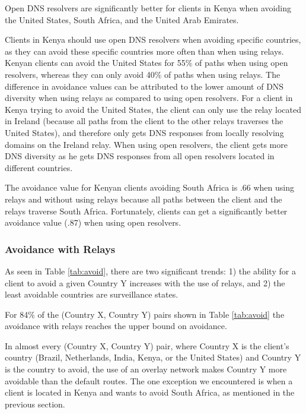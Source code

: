 \begin{finding}
Open DNS resolvers are significantly better for clients in Kenya when avoiding the United States, South Africa, and the United Arab Emirates.
\end{finding}
Clients in Kenya should use open DNS resolvers when avoiding specific countries, as they can avoid these specific countries more often than when using relays.  Kenyan clients can avoid the United States for 55\% of paths when using open resolvers, whereas they can only avoid 40\% of paths when using relays.  The difference in avoidance values can be attributed to the lower amount of DNS diversity when using relays as compared to using open resolvers. For a client in Kenya trying to avoid the United States, the client can only use the relay located in Ireland (because all paths from the client to the other relays traverses the United States), and therefore only gets DNS responses from locally resolving domains on the Ireland relay.  When using open resolvers, the client gets more DNS diversity as he gets DNS responses from all open resolvers located in different countries.

The avoidance value for Kenyan clients avoiding South Africa is .66 when using relays and without using relays because all paths between the client and the relays traverse South Africa.  Fortunately, clients can get a significantly better avoidance value (.87) when using open resolvers.  

\subsubsection{Avoidance with Relays}
As seen in Table \ref{tab:avoid}, there are two significant trends: 1) the ability for a client to avoid a given Country Y increases with the use of relays, and 2) the least avoidable countries are surveillance states.

\begin{finding}
For 84\% of the (Country X, Country Y) pairs shown in Table \ref{tab:avoid} the avoidance with relays reaches the upper bound on avoidance. 
\end{finding}
In almost every (Country X, Country Y) pair, where Country X is the client's country (Brazil, Netherlands, India, Kenya, or the United States) and Country Y is the country to avoid, the use of an overlay network makes Country Y more avoidable than the default routes.  The one exception we encountered is when a client is located in Kenya and wants to avoid South Africa, as mentioned in the previous section. 

